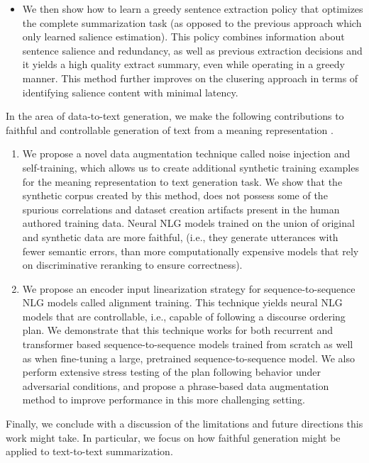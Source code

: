 \begin{enumerate}
\begin{itemize}
    \item We then show how to learn a greedy sentence extraction policy that
optimizes the complete summarization task (as opposed to the previous approach
which only learned salience estimation). This policy combines information about
sentence salience and redundancy, as well as previous extraction decisions and
it yields a high quality extract summary, even while operating in a greedy
manner. This method further improves on the clusering approach in terms of
identifying salience content with minimal latency.
  \end{itemize}
\end{enumerate}
  
In the area of data-to-text generation, we make the following contributions to
faithful and controllable generation of text from a meaning representation
\citep{kedzie2019,kedzie2020}.  
\begin{enumerate}
  \item We propose a novel data augmentation technique called noise injection
and self-training, which allows us to create additional synthetic training
examples for the meaning representation to text generation task. We show that
the synthetic corpus created by this method, does not possess some of the
spurious correlations and dataset creation artifacts present in the human
authored training data.  Neural NLG models trained on the union of original and
synthetic data are more faithful, (i.e., they generate utterances with fewer
semantic errors, than more computationally expensive models that rely on
discriminative reranking  to ensure correctness).
  \item We propose an encoder input linearization strategy for
sequence-to-sequence NLG models called alignment training.   This technique
yields neural NLG models that are controllable, i.e., capable of following a
discourse ordering plan.  We demonstrate that this technique works for both
recurrent and transformer based sequence-to-sequence models trained from
scratch as well as when fine-tuning a large, pretrained sequence-to-sequence
model. We also perform extensive stress testing of the plan following behavior
under adversarial conditions, and propose a phrase-based data augmentation
method to improve performance in this more challenging setting.
\end{enumerate}
  
Finally, we conclude with a discussion of the limitations and future directions
this work might take. In particular, we focus on how faithful generation might
be applied to text-to-text summarization. 
